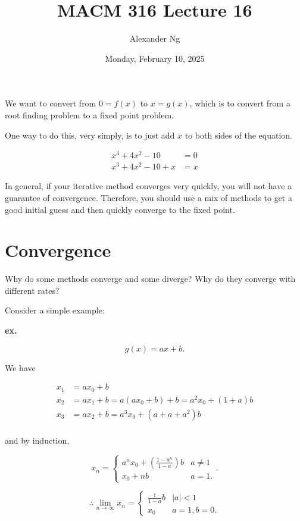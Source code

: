 \documentclass[12pt]{article}
\newcommand{\ex}{\textbf{ex.}\xspace}
\newcommand{\pr}[1]{\left( #1 \right)}
\begin{document}
\title{MACM 316 Lecture 16}
\author{Alexander Ng}
\date{Monday, February 10, 2025}

\maketitle

We want to convert from $0 = f(x)$ to $x=g(x)$, which is to convert from a root
finding problem to a fixed point problem.

One way to do this, very simply, is to just add $x$ to both sides of the
equation.

\begin{align*}
  x^3 + 4x^2 -10 &= 0 \\
  x^3 + 4x^2 -10 + x &= x
\end{align*}

In general, if your iterative method converges very quickly, you will not have
a guarantee of convergence. Therefore, you should use a mix of methods to
get a good initial guess and then quickly converge to the fixed point.

\section{Convergence}

Why do some methods converge and some diverge? Why do they converge with
different rates?

Consider a simple example:

\ex

\[
g(x) = ax+b
.\]

We have

\begin{align*}
  x_1 &=  ax_0 + b \\
  x_2 &=  ax_1 + b = a(ax_0 + b) + b = a^2x_0 + (1+a)b \\
  x_3 &=  ax_2 + b = a^3x_0 + (a+a+a^2)b \\
\end{align*}

and by induction,

\begin{equation*}
  x_n = \begin{cases}
    a^nx_0 + \pr{ \frac{1-a^n}{1-a} } b & a \ne 1 \\
    x_0 + nb & a = 1
  .\end{cases}
.\end{equation*}

\begin{equation*}
  \therefore \lim_{n \to \infty} x_n = \begin{cases}
    \frac{1}{1-a}b & |a| < 1 \\
    x_0 &  a = 1, b = 0
  .\end{cases}
\end{equation*}
\end{document}
